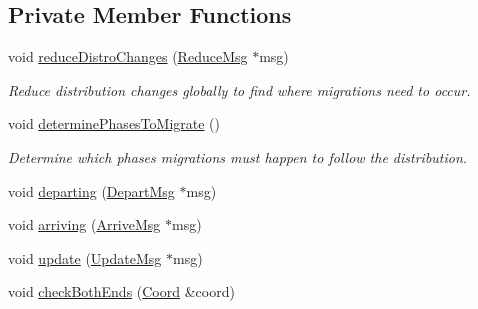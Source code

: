 \subsection*{Private Member Functions}
\begin{DoxyCompactItemize}
\item 
void \hyperlink{structvt_1_1vrt_1_1collection_1_1balance_1_1_l_b_data_restart_reader_a8e8e7c6ddc116665061679c876257a3d}{reduce\+Distro\+Changes} (\hyperlink{structvt_1_1vrt_1_1collection_1_1balance_1_1_l_b_data_restart_reader_a59e2b9e568683c89c9af430adacba420}{Reduce\+Msg} $\ast$msg)
\begin{DoxyCompactList}\small\item\em Reduce distribution changes globally to find where migrations need to occur. \end{DoxyCompactList}\item 
void \hyperlink{structvt_1_1vrt_1_1collection_1_1balance_1_1_l_b_data_restart_reader_af9cb0f3ba080b54902909a34f6fe0fef}{determine\+Phases\+To\+Migrate} ()
\begin{DoxyCompactList}\small\item\em Determine which phases migrations must happen to follow the distribution. \end{DoxyCompactList}\item 
void \hyperlink{structvt_1_1vrt_1_1collection_1_1balance_1_1_l_b_data_restart_reader_a307888d173e79695956a9ed6dc247c7a}{departing} (\hyperlink{structvt_1_1vrt_1_1collection_1_1balance_1_1_l_b_data_restart_reader_1_1_depart_msg}{Depart\+Msg} $\ast$msg)
\item 
void \hyperlink{structvt_1_1vrt_1_1collection_1_1balance_1_1_l_b_data_restart_reader_abbdef5a1c61003624ef5a41d281ec355}{arriving} (\hyperlink{structvt_1_1vrt_1_1collection_1_1balance_1_1_l_b_data_restart_reader_1_1_arrive_msg}{Arrive\+Msg} $\ast$msg)
\item 
void \hyperlink{structvt_1_1vrt_1_1collection_1_1balance_1_1_l_b_data_restart_reader_ae5101e7bdafbc8c6d546330b0fbadd4f}{update} (\hyperlink{structvt_1_1vrt_1_1collection_1_1balance_1_1_l_b_data_restart_reader_1_1_update_msg}{Update\+Msg} $\ast$msg)
\item 
void \hyperlink{structvt_1_1vrt_1_1collection_1_1balance_1_1_l_b_data_restart_reader_a7d8669c0396398818721febf079213c9}{check\+Both\+Ends} (\hyperlink{structvt_1_1vrt_1_1collection_1_1balance_1_1_l_b_data_restart_reader_1_1_coord}{Coord} \&coord)
\end{DoxyCompactItemize}
